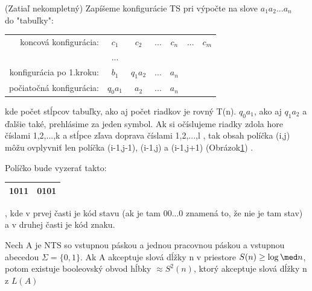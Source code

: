 \begin{dokaz}(Zatiaľ nekompletný) Zapíšeme konfigurácie TS pri výpočte na slove
$a_1a_2...a_n$\\ do "tabuľky":
\begin{center}
\begin{tabular}{rcccccc}

   koncová konfigurácia:& $c_1$    &  $c_2$   & $...$ & $c_n$  & $...$ & $c_m$ \\

                        & $...$    &          &       &     \\

konfigurácia po 1.kroku:& $b_1$    & $q_1a_2$ & $...$ & $a_n$     \\

počiatočná konfigurácia:& $q_0a_1$ & $a_2$    & $...$ & $a_n$     \\

\end{tabular}
\end{center}
kde počet stĺpcov tabuľky, ako aj počet riadkov je rovný T(n). $q_0a_1$, ako aj $q_1a_2$
a ďalšie také, prehlásime za jeden symbol. Ak si očíslujeme riadky zdola hore číslami
1,2,...,k a stĺpce zľava doprava číslami 1,2,...,l , tak obsah políčka (i,j) môžu
ovplyvniť len políčka (i-1,j-1), (i-1,j) a (i-1,j+1) (Obrázok\ref{BObr4}) .
\begin{figure}[!ht]
\centering
\caption{} \label{BObr4}
\end{figure}

Políčko bude vyzerať takto: \begin{tabular}{|c|c|} \hline 1011 & 0101 \\ \hline
\end{tabular}, kde v prvej časti je kód stavu (ak je tam 00...0 znamená to, že nie je tam
stav) a v druhej časti je kód znaku.

\end{dokaz}

\begin{veta}
Nech A je NTS so vstupnou páskou a jednou pracovnou páskou a vstupnou abecedou
$\Sigma=\{0,1\}$. Ak A akceptuje slová dĺžky n v priestore $S(n)\geq \log\med n$, potom
existuje booleovský obvod hĺbky $\approx S^2(n)$, ktorý akceptuje slová dĺžky n z $L(A)$
\end{veta}

